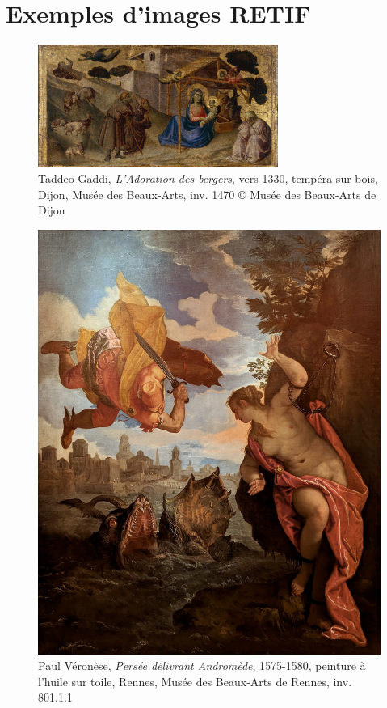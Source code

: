 \section{Exemples d'images RETIF}

\begin{figure}[H]
    \centering
    \includegraphics[width=0.7\textwidth]{annexes/figures/ptrGaddiAdoration.jpg}
    \caption{Taddeo Gaddi, \textit{L'Adoration des bergers}, vers 1330, tempéra sur bois, Dijon, Musée des Beaux-Arts, inv. 1470 © Musée des Beaux-Arts de Dijon}
    \label{fig:ptrGaddiAdoration}
\end{figure}


\begin{figure}[H]
    \centering
    \includegraphics[height=0.4\textheight]{annexes/figures/ptrVeronesePersee.jpg}
    \caption{Paul Véronèse, \textit{Persée délivrant Andromède}, 1575-1580, peinture à l'huile sur toile, Rennes, Musée des Beaux-Arts de Rennes, inv. 801.1.1}
    \label{fig:ptrVeronesePersee}
\end{figure}

